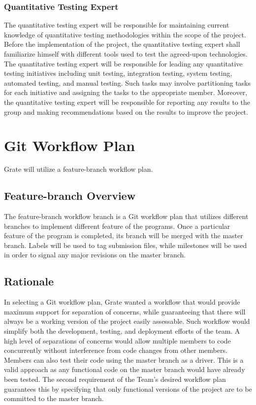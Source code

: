 \documentclass{article}
\begin{document}
\subsubsection{Quantitative Testing Expert}
The quantitative testing expert will be responsible for maintaining current 
knowledge of quantitative testing methodologies within the scope of the project. 
Before the implementation of the project, the quantitative testing expert shall 
familiarize himself with different tools used to test the agreed-upon 
technologies. The quantitative testing expert will be responsible for leading 
any quantitative testing initiatives including unit testing, integration 
testing, system testing, automated testing, and manual testing. Such tasks may 
involve partitioning tasks for each initiative and assigning the tasks to the 
appropriate member. Moreover, the quantitative testing expert will be 
responsible for reporting any results to the group and making recommendations 
based on the results to improve the project.

\section{Git Workflow Plan}
Grate will utilize a feature-branch workflow plan. 

\subsection{Feature-branch Overview}
The feature-branch workflow branch is a Git workflow plan that utilizes 
different branches to implement different feature of the programs. Once a 
particular feature of the program is completed, its branch will be merged with 
the master branch. Labels will be used to tag submission files, while milestones 
will be used in order to signal any major revisions on the master branch.

\subsection{Rationale}
In selecting a Git workflow plan, Grate wanted a workflow that would provide 
maximum support for separation of concerns, while guaranteeing that there will 
always be a working version of the project easily assessable. Such workflow 
would simplify both the development, testing, and deployment efforts of the 
team. A high level of separations of concerns would allow multiple members to 
code concurrently without interference from code changes from other members. 
Members can also test their code using the master branch as a driver. This is a 
valid approach as any functional code on the master branch would have already 
been tested. The second requirement of the Team's desired workflow plan 
guarantees this by specifying that only functional versions of the project are 
to be committed to the master branch. 
\end{document}

